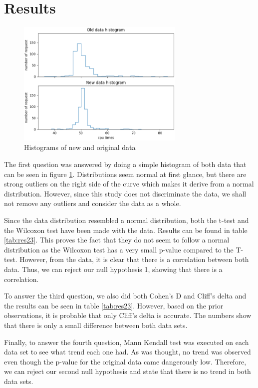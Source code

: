 \documentclass[10pt, conference]{IEEEtran}
\begin{document}
\section{Results}
\label{sec:results}

\begin{figure}[h]
    \includegraphics[width=8cm]{histograms.png}
    \caption{Histograms of new and original data}
    \label{fig:hist}
\end{figure}

The first question was answered by doing a simple histogram of both data that can be seen in figure \ref{fig:hist}. 
Distributions seem normal at first glance, but there are strong outliers on the right side of the curve which makes it derive from a normal distribution. 
However, since this study does not discriminate the data, we shall not remove any outliers and consider the data as a whole.

Since the data distribution resembled a normal distribution, both the t-test and the Wilcoxon test have been made with the data. 
Results can be found in table \ref{tab:res23}.
This proves the fact that they do not seem to follow a normal distribution as the Wilcoxon test has a very small p-value compared to the T-test.
However, from the data, it is clear that there is a correlation between both data.
Thus, we can reject our null hypothesis 1, showing that there is a correlation.

To answer the third question, we also did both Cohen's D and Cliff's delta and the results can be seen in table \ref{tab:res23}. 
However, based on the prior observations, it is probable that only Cliff's delta is accurate. 
The numbers show that there is only a small difference between both data sets.

Finally, to answer the fourth question,  Mann Kendall test was executed on each data set to see what trend each one had.
As was thought, no trend was observed even though the p-value for the original data came dangerously low.
Therefore, we can reject our second null hypothesis and state that there is no trend in both data sets.
\end{document}
